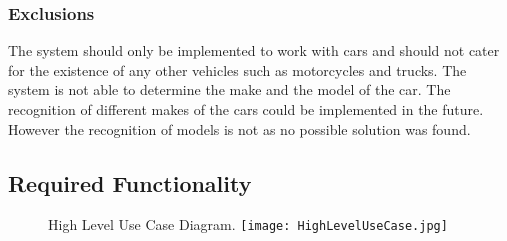 \subsubsection{Exclusions}
The system should only be implemented to work with cars and should not cater for the existence of any other vehicles such as motorcycles and trucks. The system is not able to determine the make and the model of the car. The recognition of different makes of the cars could be implemented in the future. However the recognition of models is not as no possible solution was found.

\subsection{Required Functionality}
\begin{figure}[h!]High Level Use Case Diagram.
  \centering
	\texttt{[image: HighLevelUseCase.jpg]}
\end{figure}

